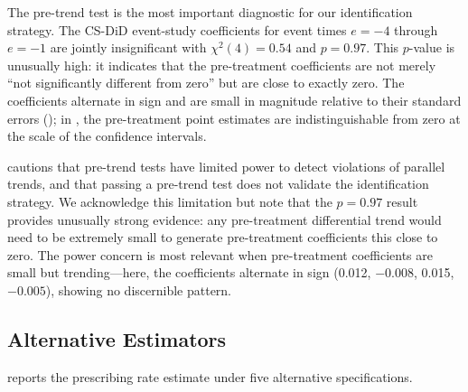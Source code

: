 \documentclass[12pt]{article}
\begin{document}
The pre-trend test is the most important diagnostic for our identification strategy. The CS-DiD event-study coefficients for event times $e = -4$ through $e = -1$ are jointly insignificant with $\chi^2(4) = 0.54$ and $p = 0.97$. This $p$-value is unusually high: it indicates that the pre-treatment coefficients are not merely ``not significantly different from zero'' but are close to exactly zero. The coefficients alternate in sign and are small in magnitude relative to their standard errors (); in , the pre-treatment point estimates are indistinguishable from zero at the scale of the confidence intervals.

\citet{roth2023pretest} cautions that pre-trend tests have limited power to detect violations of parallel trends, and that passing a pre-trend test does not validate the identification strategy. We acknowledge this limitation but note that the $p = 0.97$ result provides unusually strong evidence: any pre-treatment differential trend would need to be extremely small to generate pre-treatment coefficients this close to zero. The power concern is most relevant when pre-treatment coefficients are small but trending---here, the coefficients alternate in sign (0.012, $-0.008$, 0.015, $-0.005$), showing no discernible pattern.

\subsection{Alternative Estimators}\label{sec:robust_estimators}

 reports the prescribing rate estimate under five alternative specifications.
\end{document}

